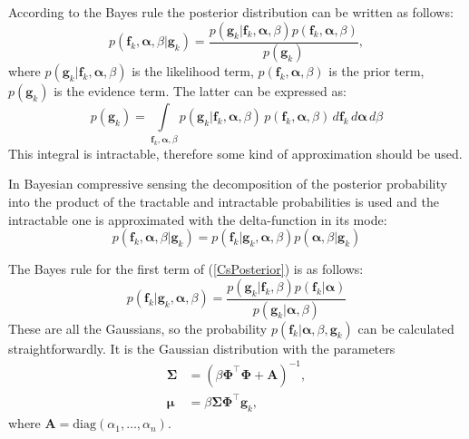 \documentclass[conference]{IEEEtran}
\begin{document}
According to the Bayes rule the posterior distribution can be written as follows:
\begin{equation}
p(\mathbf{f}_k, \boldsymbol\alpha, \beta | \mathbf{g}_k) = \frac{p(\mathbf{g}_k|\mathbf{f}_k, \boldsymbol\alpha, \beta)p(\mathbf{f}_k, \boldsymbol\alpha, \beta)}{p(\mathbf{g}_k)},
\end{equation}
where $p(\mathbf{g}_k|\mathbf{f}_k, \boldsymbol\alpha, \beta)$ is the likelihood term, $p(\mathbf{f}_k, \boldsymbol\alpha, \beta)$ is the prior term, $p(\mathbf{g}_k)$ is the evidence term. The latter can be expressed as: 
\begin{equation}
p(\mathbf{g}_k) = \int\limits_{\mathbf{f}_k, \boldsymbol\alpha, \beta} p(\mathbf{g}_k|\mathbf{f}_k, \boldsymbol\alpha, \beta) \, p(\mathbf{f}_k, \boldsymbol\alpha, \beta) \, d\mathbf{f}_k \, d\boldsymbol\alpha \, d\beta
\end{equation}
This integral is intractable, therefore some kind of approximation should be used.

In Bayesian compressive sensing \cite{Carin2008bcs} the decomposition of the posterior probability into the product of the tractable and intractable probabilities is used and the intractable one is approximated with the delta-function in its mode:
\begin{equation}
\label{CsPosterior}
p(\mathbf{f}_k, \boldsymbol\alpha, \beta | \mathbf{g}_k) = p(\mathbf{f}_k |\mathbf{g}_k, \boldsymbol\alpha, \beta)p(\boldsymbol\alpha, \beta | \mathbf{g}_k)
\end{equation}

The Bayes rule for the first term of (\ref{CsPosterior}) is as follows: 
\begin{equation}
p(\mathbf{f}_k | \mathbf{g}_k, \boldsymbol\alpha, \beta) =  \frac{p(\mathbf{g}_k | \mathbf{f}_k, \beta) p(\mathbf{f}_k | \boldsymbol\alpha)}{p(\mathbf{g}_k | \boldsymbol\alpha, \beta)}
\end{equation}
These are all the Gaussians, so the probability $p(\mathbf{f}_k | \boldsymbol\alpha, \beta, \mathbf{g}_k)$ can be calculated straightforwardly. It is the Gaussian distribution with the parameters 
\begin{align}
\label{CsLikelihoodParametersSigma}
\mathbf{\Sigma} &= (\beta\mathbf{\Phi}^{\top}\mathbf{\Phi} + \mathbf{A})^{-1}, \\
\label{CsLikelihoodParametersMu}
\boldsymbol\mu &= \beta\mathbf{\Sigma}\mathbf{\Phi}^{\top}\mathbf{g}_k,
\end{align}
where $\mathbf{A} = \text{diag}(\alpha_1, \ldots, \alpha_n)$.
\end{document}
